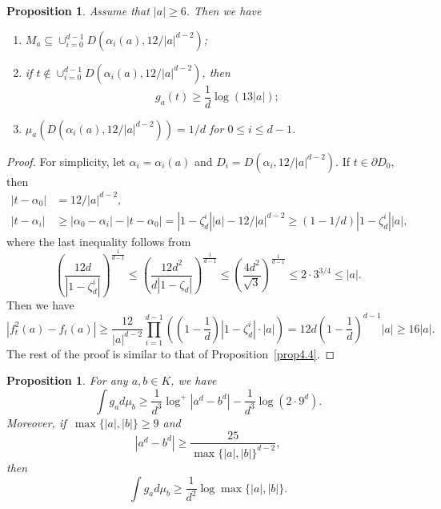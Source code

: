 \documentclass[11pt]{amsart}
\numberwithin{equation}{section}
\theoremstyle{plain}
\newtheorem{prop}[thm]{Proposition}
\theoremstyle{definition}
\theoremstyle{remark}
\begin{document}
\begin{prop}\label{prop4.7}
  Assume that $|a|\geq6$. Then we have
\begin{enumerate}
\item $M_{a}\subseteq\cup_{i=0}^{d-1}D(\alpha_{i}(a),12/|a|^{d-2})$; 
\item if $t\notin\cup_{i=0}^{d-1}D(\alpha_{i}(a),12/|a|^{d-2})$, then
\[
g_{a}(t)\geq\frac{1}{d}\log(13|a|); 
\]
\item $\mu_{a}(D(\alpha_{i}(a),12/|a|^{d-2}))=1/d$ for $0\leq i\leq d-1$.
\end{enumerate}
\end{prop}

\begin{proof}
For simplicity, let $\alpha_{i}=\alpha_{i}(a)$ and $D_{i}=D(\alpha_{i},12/|a|^{d-2})$.
If $t\in\partial D_{0}$, then
\begin{align*}
|t-\alpha_{0}| & =12/|a|^{d-2},\\
|t-\alpha_{i}| & \geq|\alpha_{0}-\alpha_{i}|-|t-\alpha_{0}|=\left|1-\zeta_{d}^{i}\right||a|-12/|a|^{d-2}\geq(1-1/d)\left|1-\zeta_{d}^{i}\right||a|,
\end{align*}
where the last inequality follows from
\[
\left(\frac{12d}{\left|1-\zeta_{d}^{i}\right|}\right)^{\frac{1}{d-1}}\leq\left(\frac{12d^{2}}{d\left|1-\zeta_{d}\right|}\right)^{\frac{1}{d-1}}\leq\left(\frac{4d^{2}}{\sqrt{3}}\right)^{\frac{1}{d-1}}\leq2\cdot3^{3/4}\leq|a|.
\]
Then we have
\[
|f_{t}^{2}(a)-f_{t}(a)|\geq\frac{12}{|a|^{d-2}}\prod_{i=1}^{d-1}\left(\left(1-\frac{1}{d}\right)|1-\zeta_{d}^{i}|\cdot|a|\right)=12d\left(1-\frac{1}{d}\right)^{d-1}|a|\geq16|a|.
\]
The rest of the proof is similar to that of Proposition~\ref{prop4.4}.
\end{proof}

\begin{prop}\label{prop4.8}
For any $a,b\in K$, we have
\[
\int g_{a}d\mu_{b}\geq\frac{1}{d^{3}}\log^{+}\left|a^{d}-b^{d}\right|-\frac{1}{d^{3}}\log\left(2\cdot9^{d}\right).
\]
Moreover, if\, $\max\{|a|,|b|\}\geq9$ and
\begin{equation}
\left|a^{d}-b^{d}\right|\geq\frac{25}{\max\{|a|,|b|\}^{d-2}},\label{eq4.2}
\end{equation}
then
\[
\int g_{a}d\mu_{b}\geq\frac{1}{d^{2}}\log\max\{|a|,|b|\}.
\]
\end{prop}
\end{document}
